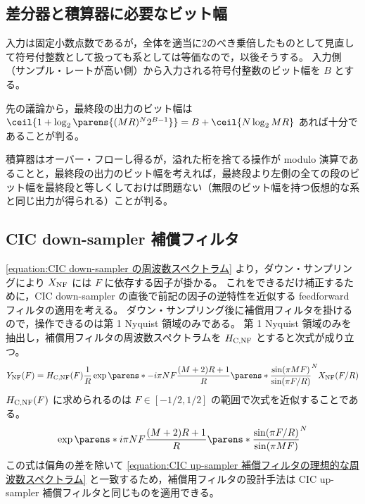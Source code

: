     \subsection{差分器と積算器に必要なビット幅}
        入力は固定小数点数であるが，全体を適当に2のべき乗倍したものとして見直して符号付整数として扱っても系としては等価なので，以後そうする。
        入力側（サンプル・レートが高い側）から入力される符号付整数のビット幅を $B$ とする。
        \par
        先の議論から，最終段の出力のビット幅は $\ceil{1 + \log_2\parens{(MR)^N 2^{B-1}}} = B + \ceil{N\log_2 MR}$ あれば十分であることが判る。
        \par
        積算器はオーバー・フローし得るが，溢れた桁を捨てる操作が modulo 演算であることと，最終段の出力のビット幅を考えれば，最終段より左側の全ての段のビット幅を最終段と等しくしておけば問題ない（無限のビット幅を持つ仮想的な系と同じ出力が得られる）ことが判る。
    \subsection{CIC down-sampler 補償フィルタ}
        \cref{equation:CIC down-sampler の周波数スペクトラム} より，ダウン・サンプリングにより $X_\text{NF}$ には $F$ に依存する因子が掛かる。
        これをできるだけ補正するために，CIC down-sampler の直後で前記の因子の逆特性を近似する feedforward フィルタの適用を考える。
        ダウン・サンプリング後に補償用フィルタを掛けるので，操作できるのは第 1 Nyquist 領域のみである。
        第 1 Nyquist 領域のみを抽出し，補償用フィルタの周波数スペクトラムを $H_\text{C,NF}$ とすると次式が成り立つ。
        \[ \YNF(F) = \HCNF(F) \frac{1}{R} \exp\parens*{-i\pi N F\frac{(M+2)R+1}{R}}\parens*{\frac{\sin(\pi MF)}{\sin(\pi F/R)}}^N \XNF(F/R) \]
        $H_\text{C,NF}(F)$ に求められるのは $F \in [-1/2,1/2]$ の範囲で次式を近似することである。
        \begin{equation}
            \exp\parens*{i\pi N F\frac{(M+2)R+1}{R}}\parens*{\frac{\sin(\pi F/R)}{\sin(\pi MF)}}^N
        \end{equation}
        この式は偏角の差を除いて \cref{equation:CIC up-sampler 補償フィルタの理想的な周波数スペクトラム} と一致するため，補償用フィルタの設計手法は CIC up-sampler 補償フィルタと同じものを適用できる。
